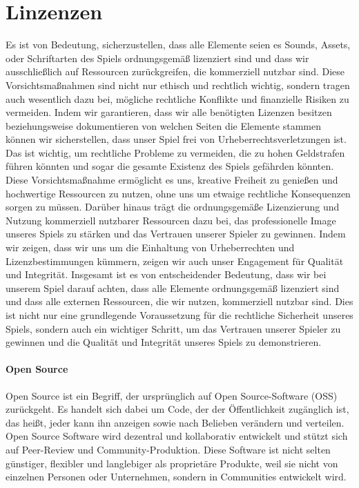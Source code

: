 
\chapter{Linzenzen}\label{ch:lizenzen}
\renewcommand{\kapitelautor}{Autor: Nils Hubmann}

%
Es ist von Bedeutung, sicherzustellen, dass alle Elemente seien es Sounds, Assets, oder Schriftarten des Spiels ordnungsgemäß lizenziert sind und dass wir ausschließlich auf Ressourcen zurückgreifen, die kommerziell nutzbar sind.
Diese Vorsichtsmaßnahmen sind nicht nur ethisch und rechtlich wichtig, sondern tragen auch wesentlich dazu bei, mögliche rechtliche Konflikte und finanzielle Risiken zu vermeiden.
Indem wir garantieren, dass wir alle benötigten Lizenzen besitzen beziehungsweise dokumentieren von welchen Seiten die Elemente stammen können wir sicherstellen, dass unser Spiel frei von Urheberrechtsverletzungen ist.
Das ist wichtig, um rechtliche Probleme zu vermeiden, die zu hohen Geldstrafen führen könnten und sogar die gesamte Existenz des Spiels gefährden könnten.
Diese Vorsichtsmaßnahme ermöglicht es uns, kreative Freiheit zu genießen und hochwertige Ressourcen zu nutzen, ohne uns um etwaige rechtliche Konsequenzen sorgen zu müssen.
Darüber hinaus trägt die ordnungsgemäße Lizenzierung und Nutzung kommerziell nutzbarer Ressourcen dazu bei, das professionelle Image unseres Spiels zu stärken und das Vertrauen unserer Spieler zu gewinnen.
Indem wir zeigen, dass wir uns um die Einhaltung von Urheberrechten und Lizenzbestimmungen kümmern, zeigen wir auch unser Engagement für Qualität und Integrität.
Insgesamt ist es von entscheidender Bedeutung, dass wir bei unserem Spiel darauf achten, dass alle Elemente ordnungsgemäß lizenziert sind und dass alle externen Ressourcen, die wir nutzen, kommerziell nutzbar sind.
Dies ist nicht nur eine grundlegende Voraussetzung für die rechtliche Sicherheit unseres Spiels, sondern auch ein wichtiger Schritt, um das Vertrauen unserer Spieler zu gewinnen und die Qualität und Integrität unseres Spiels zu demonstrieren.
%
\subsubsection{Open Source}\label{subsubsec:Open-Source}
%

\begin{coolQuote}
Open Source ist ein Begriff, der ursprünglich auf Open Source-Software (OSS) zurückgeht.
Es handelt sich dabei um Code, der der Öffentlichkeit zugänglich ist, das heißt, jeder kann ihn anzeigen sowie nach Belieben verändern und verteilen.
Open Source Software wird dezentral und kollaborativ entwickelt und stützt sich auf Peer-Review und Community-Produktion.
Diese Software ist nicht selten günstiger, flexibler und langlebiger als proprietäre Produkte, weil sie nicht von einzelnen Personen oder Unternehmen, sondern in Communities entwickelt wird.
\end{coolQuote}

